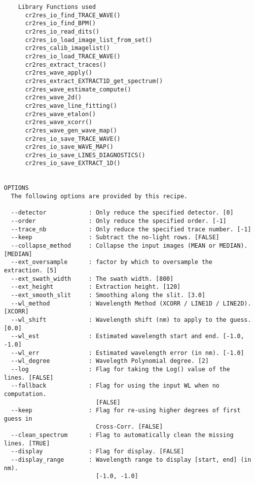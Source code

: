\begin{verbatim}
    Library Functions used                                                
      cr2res_io_find_TRACE_WAVE()                                         
      cr2res_io_find_BPM()                                                
      cr2res_io_read_dits()                                               
      cr2res_io_load_image_list_from_set()                                
      cr2res_calib_imagelist()                                            
      cr2res_io_load_TRACE_WAVE()                                         
      cr2res_extract_traces()                                             
      cr2res_wave_apply()                                                 
      cr2res_extract_EXTRACT1D_get_spectrum()                             
      cr2res_wave_estimate_compute()                                      
      cr2res_wave_2d()                                                    
      cr2res_wave_line_fitting()                                          
      cr2res_wave_etalon()                                                
      cr2res_wave_xcorr()                                                 
      cr2res_wave_gen_wave_map()                                          
      cr2res_io_save_TRACE_WAVE()                                         
      cr2res_io_save_WAVE_MAP()                                           
      cr2res_io_save_LINES_DIAGNOSTICS()                                  
      cr2res_io_save_EXTRACT_1D()                                         
  

OPTIONS
  The following options are provided by this recipe.

  --detector            : Only reduce the specified detector. [0]
  --order               : Only reduce the specified order. [-1]
  --trace_nb            : Only reduce the specified trace number. [-1]
  --keep                : Subtract the no-light rows. [FALSE]
  --collapse_method     : Collapse the input images (MEAN or MEDIAN). [MEDIAN]
  --ext_oversample      : factor by which to oversample the extraction. [5]
  --ext_swath_width     : The swath width. [800]
  --ext_height          : Extraction height. [120]
  --ext_smooth_slit     : Smoothing along the slit. [3.0]
  --wl_method           : Wavelength Method (XCORR / LINE1D / LINE2D). [XCORR]
  --wl_shift            : Wavelength shift (nm) to apply to the guess. [0.0]
  --wl_est              : Estimated wavelength start and end. [-1.0, -1.0]
  --wl_err              : Estimated wavelength error (in nm). [-1.0]
  --wl_degree           : Wavelegth Polynomial degree. [2]
  --log                 : Flag for taking the Log() value of the lines. [FALSE]
  --fallback            : Flag for using the input WL when no computation.
                          [FALSE]
  --keep                : Flag for re-using higher degrees of first guess in
                          Cross-Corr. [FALSE]
  --clean_spectrum      : Flag to automatically clean the missing lines. [TRUE]
  --display             : Flag for display. [FALSE]
  --display_range       : Wavelength range to display [start, end] (in nm).
                          [-1.0, -1.0]

\end{verbatim}
